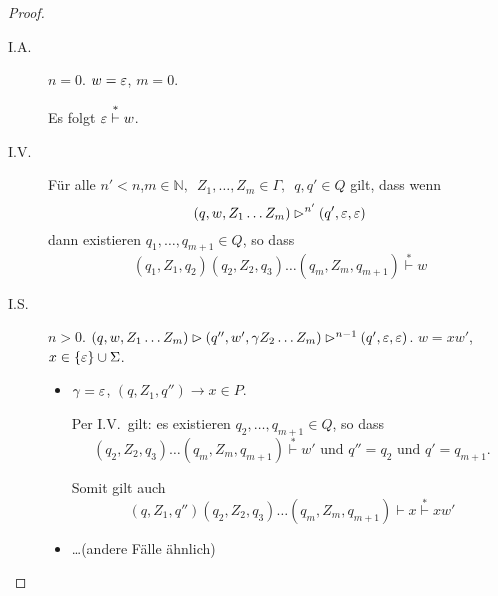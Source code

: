 \begin{proof}
\begin{itemize}
      \begin{description}
      \item[I.A.] $n = 0$.
        $w = \varepsilon$, $m = 0$.

        Es folgt $\varepsilon \stackrel{*}{\vdash} w$.
      \item[I.V.] Für alle $n' < n$,\enspace $m \in \mathbb{N},\enspace Z_1,\ldots,Z_m\in \Gamma,\enspace q,q' \in Q$ gilt, dass wenn
        \begin{displaymath}
        (q,w,Z_1\ldots Z_m) \rhd^{n'} (q', \varepsilon, \varepsilon)
      \end{displaymath}
      dann existieren $q_1,\ldots,q_{m+1} \in Q$, so dass
      \begin{displaymath}
        (q_1,Z_1,q_2)(q_2,Z_2,q_3)\ldots(q_m,Z_m,q_{m+1}) \stackrel{*}{\vdash} w
      \end{displaymath}

    \item[I.S.] $n > 0$.
      $(q, w, Z_1\ldots Z_m) \rhd (q'', w', \gamma Z_2\ldots Z_m) \rhd^{n-1} (q',\varepsilon, \varepsilon)$.
      $w =xw'$, \enspace $x \in \{\varepsilon\} \cup \Sigma$.
      \begin{itemize}
      \item $\gamma = \varepsilon$, \enspace $(q, Z_1, q'') \to x \in P$.

        Per I.V.\ gilt: es existieren $q_2,\ldots,q_{m+1} \in Q$, so dass
        \begin{displaymath}
          (q_2, Z_2, q_3)\ldots(q_m,Z_m,q_{m+1}) \stackrel{*}{\vdash} w' \text{ und } q''=q_2 \text{ und } q'=q_{m+1}.
        \end{displaymath}

        Somit gilt auch
        \begin{displaymath}
          (q, Z_1, q'') (q_2, Z_2, q_3)\ldots(q_m,Z_m,q_{m+1})\vdash x\stackrel{*}{\vdash} xw'
        \end{displaymath}
      \item \ldots (andere Fälle ähnlich)
      \end{itemize}
      \end{description}
  \end{itemize}
\end{proof}



